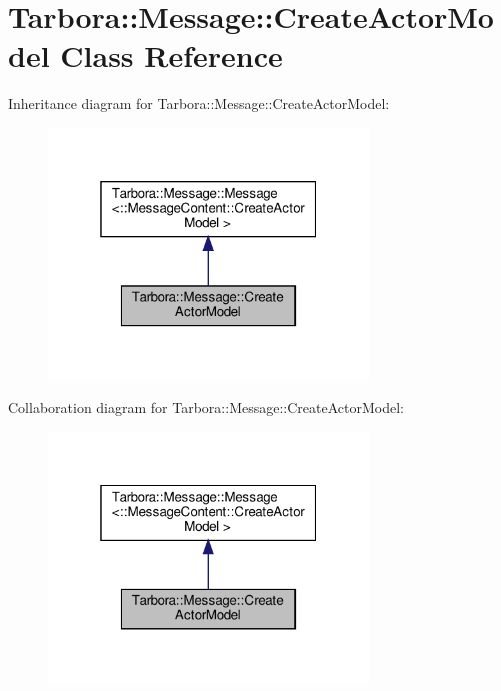 \hypertarget{classTarbora_1_1Message_1_1CreateActorModel}{}\section{Tarbora\+:\+:Message\+:\+:Create\+Actor\+Model Class Reference}
\label{classTarbora_1_1Message_1_1CreateActorModel}


Inheritance diagram for Tarbora\+:\+:Message\+:\+:Create\+Actor\+Model\+:
\nopagebreak
\begin{figure}[H]
\begin{center}
\leavevmode
\includegraphics[width=241pt]{classTarbora_1_1Message_1_1CreateActorModel__inherit__graph}
\end{center}
\end{figure}


Collaboration diagram for Tarbora\+:\+:Message\+:\+:Create\+Actor\+Model\+:
\nopagebreak
\begin{figure}[H]
\begin{center}
\leavevmode
\includegraphics[width=241pt]{classTarbora_1_1Message_1_1CreateActorModel__coll__graph}
\end{center}
\end{figure}

